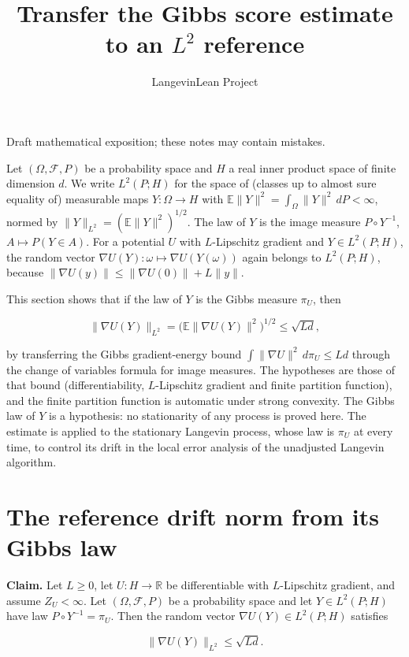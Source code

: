 \documentclass[11pt,a4paper]{article}
\title{\texorpdfstring{Transfer the Gibbs score estimate to an \(L^2\) reference}{Transfer the Gibbs score estimate to an L² reference}}
\author{LangevinLean Project}
\date{}
\begin{document}
\maketitle
Draft mathematical exposition; these notes may contain mistakes.


Let \((\Omega,\mathcal F,P)\) be a probability space and \(H\) a real inner product space of finite dimension \(d\). We write \(L^2(P;H)\) for the space of (classes up to almost sure equality of) measurable maps \(Y:\Omega\to H\) with \(\mathbb E\|Y\|^2=\int_\Omega\|Y\|^2\,dP<\infty\), normed by \(\|Y\|_{L^2}=(\mathbb E\|Y\|^2)^{1/2}\). The law of \(Y\) is the image measure \(P\circ Y^{-1}\), \(A\mapsto P(Y\in A)\). For a potential \(U\) with \(L\)-Lipschitz gradient and \(Y\in L^2(P;H)\), the random vector \(\nabla U(Y):\omega\mapsto\nabla U(Y(\omega))\) again belongs to \(L^2(P;H)\), because \(\|\nabla U(y)\|\le\|\nabla U(0)\|+L\|y\|\).




This section shows that if the law of \(Y\) is the Gibbs measure \(\pi_U\), then


\[\|\nabla U(Y)\|_{L^2}=\bigl(\mathbb E\|\nabla U(Y)\|^2\bigr)^{1/2}\le\sqrt{Ld},\]


by transferring the Gibbs gradient-energy bound \(\int\|\nabla U\|^2\,d\pi_U\le Ld\) through the change of variables formula for image measures. The hypotheses are those of that bound (differentiability, \(L\)-Lipschitz gradient and finite partition function), and the finite partition function is automatic under strong convexity. The Gibbs law of \(Y\) is a hypothesis: no stationarity of any process is proved here. The estimate is applied to the stationary Langevin process, whose law is \(\pi_U\) at every time, to control its drift in the local error analysis of the unadjusted Langevin algorithm.


\section{\texorpdfstring{The reference drift norm from its Gibbs law}{The reference drift norm from its Gibbs law}}


\textbf{Claim.} Let \(L\ge0\), let \(U:H\to\mathbb R\) be differentiable with \(L\)-Lipschitz gradient, and assume \(Z_U<\infty\). Let \((\Omega,\mathcal F,P)\) be a probability space and let \(Y\in L^2(P;H)\) have law \(P\circ Y^{-1}=\pi_U\). Then the random vector \(\nabla U(Y)\in L^2(P;H)\) satisfies


\[\|\nabla U(Y)\|_{L^2}\le\sqrt{Ld}.\]
\end{document}
